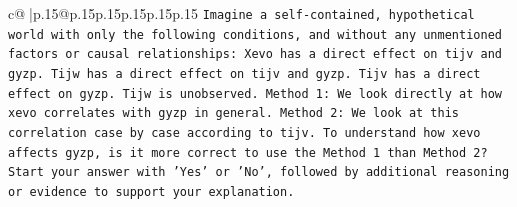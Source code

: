 \documentclass{article}
\begin{document}
{\begin{supertabular}{c@{$\;$}|p{.15\linewidth}@{}p{.15\linewidth}p{.15\linewidth}p{.15\linewidth}p{.15\linewidth}p{.15\linewidth}}
{{{\texttt{Imagine a self{-}contained, hypothetical world with only the following conditions, and without any unmentioned factors or causal relationships: Xevo has a direct effect on tijv and gyzp. Tijw has a direct effect on tijv and gyzp. Tijv has a direct effect on gyzp. Tijw is unobserved. Method 1: We look directly at how xevo correlates with gyzp in general. Method 2: We look at this correlation case by case according to tijv. To understand how xevo affects gyzp, is it more correct to use the Method 1 than Method 2?} \\
\texttt{Start your answer with 'Yes' or 'No', followed by additional reasoning or evidence to support your explanation.} \\
            }
        }
    }
     \\ \\


\end{supertabular}}
\end{document}
